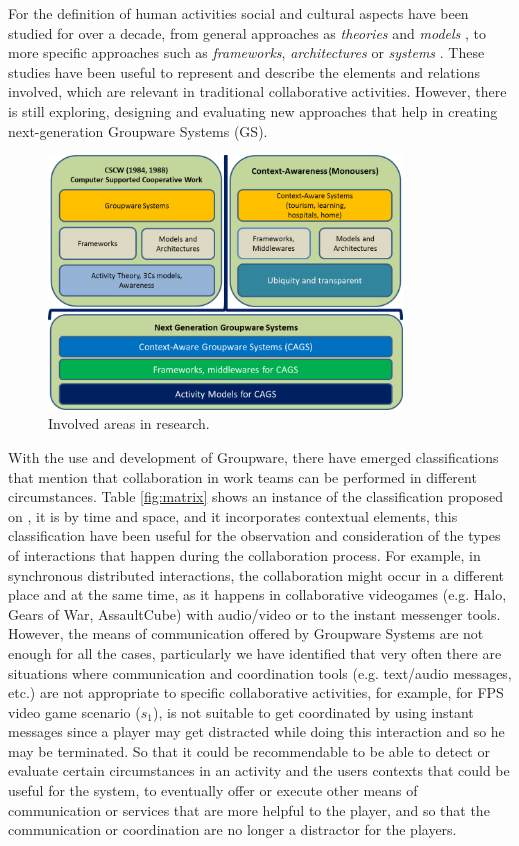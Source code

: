 \documentclass[conference]{./sty/IEEEtran}
\begin{document}
For the definition of human activities social and cultural aspects have been studied for over a decade, from general approaches as \textit{theories} \cite{Engestrom87} and \textit{models} \cite{Mezura03,Fitzpatrick03,Martel06}, to more specific approaches such as \textit{frameworks}, \textit{architectures} or \textit{systems} \cite{Preguica05,Guicking06}. These studies have been useful to represent and describe the elements and relations involved, which are relevant in traditional collaborative activities. However, there is still exploring, designing and evaluating new approaches that help in creating next-generation Groupware Systems (GS).

\begin{figure}[ht!]
	\centering
	\includegraphics[width=9.4cm]{images/contextoInvestigacion.png}
	\caption{Involved areas in research.} %
	\label{fig:contextoInvestigacion}
\end{figure}

With the use and development of Groupware, there have emerged classifications that mention that collaboration in work teams can be performed in different circumstances. Table \ref{fig:matrix} shows an instance of the classification proposed on \cite{Johansen88}, it is by time and space, and it incorporates contextual elements, this classification have been useful for the observation and consideration of the types of interactions that happen during the collaboration process. For example, in synchronous distributed interactions, the collaboration might occur in a different place and at the same time, as it happens in collaborative videogames (e.g. Halo, Gears of War, AssaultCube) with audio/video or to the instant messenger tools. However, the means of communication offered by Groupware Systems are not enough for all the cases, particularly we have identified that very often there are situations where communication and coordination tools (e.g. text/audio messages, etc.) are not appropriate to specific collaborative activities, for example, for FPS video game scenario ($s_1$), is not suitable to get coordinated by using instant messages since a player may get distracted while doing this interaction and so he may be terminated. So that it could be recommendable to be able to detect or evaluate certain circumstances in an activity and the users contexts that could be useful for the system, to eventually offer or execute other means of communication or services that are more helpful to the player, and so that the communication or coordination are no longer a distractor for the players.
\end{document}
